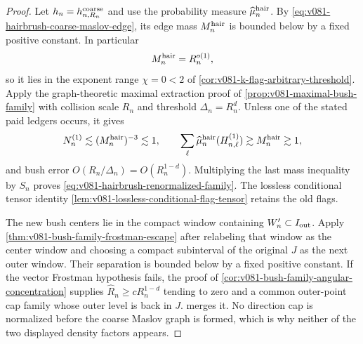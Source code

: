 \documentclass[10pt]{article}
\begin{document}
\begin{proof}
Let \(h_n=h^{\rm coarse}_{n,R_n}\) and use the probability measure
\(\widehat\mu_n^{\rm hair}\).  By
\eqref{eq:v081-hairbrush-coarse-maslov-edge}, its edge mass \(M_n^{\rm hair}\) is bounded below by
a fixed positive constant.  In particular
\[
M_n^{\rm hair}=R_n^{o(1)},
\]
so it lies in the exponent range \(\chi=0<2\) of
\cref{cor:v081-k-flag-arbitrary-threshold}.  Apply the graph-theoretic maximal extraction proof of
\cref{prop:v081-maximal-bush-family} with collision scale \(R_n\) and threshold
\(\Delta_n=R_n^d\).  Unless one of the stated paid ledgers occurs, it gives
\[
N_n^{(1)}\lesssim (M_n^{\rm hair})^{-3}\lesssim1,
\qquad
\sum_\ell
\widehat\mu_n^{\rm hair}(H^{(1)}_{n,\ell})
\gtrsim M_n^{\rm hair}\gtrsim1,
\]
and bush error \(O(R_n/\Delta_n)=O(R_n^{1-d})\).
Multiplying the last mass inequality by \(S_n\) proves
\eqref{eq:v081-hairbrush-renormalized-family}.  The lossless conditional tensor identity
\cref{lem:v081-lossless-conditional-flag-tensor} retains the old flags.

The new bush centers lie in the compact window containing \(W_n'\subset I_{\rm out}\).
Apply \cref{thm:v081-bush-family-frostman-escape} after relabeling that window as the center
window and choosing a compact subinterval of the original \(J\) as the next outer window.  Their
separation is bounded below by a fixed positive constant.  If the vector Frostman hypothesis
fails, the proof of \cref{cor:v081-bush-family-angular-concentration} supplies
\(\widehat R_n\ge cR_n^{1-d}\) tending to zero and a common outer-point cap family whose outer
level is back in \(J\).   merges it.  No direction cap is normalized before
the coarse Maslov graph is formed, which is why neither of the two displayed density factors
appears.
\end{proof}
\end{document}
